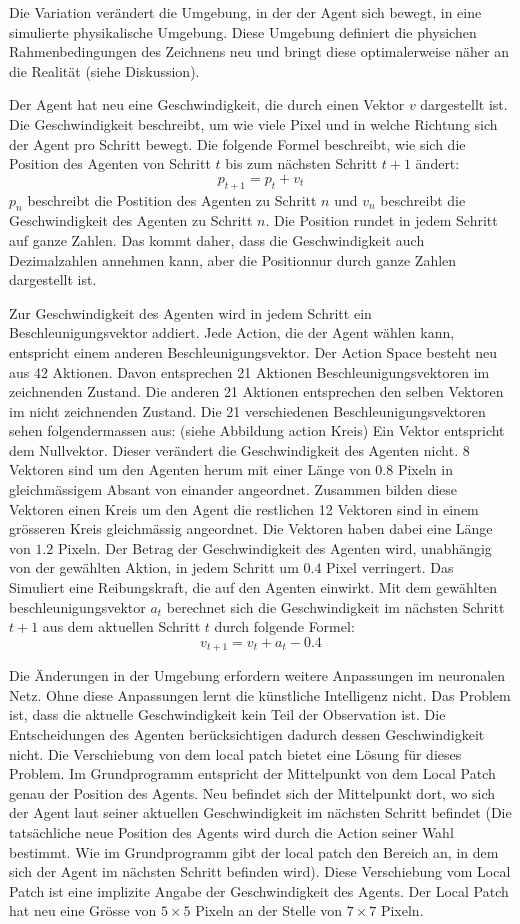 Die Variation verändert die Umgebung, in der der Agent sich bewegt, in eine
simulierte physikalische Umgebung. Diese Umgebung definiert die physichen
Rahmenbedingungen des Zeichnens neu und bringt diese optimalerweise näher an die
Realität (siehe Diskussion). 

Der Agent hat neu eine Geschwindigkeit, die durch einen Vektor $v$ dargestellt
ist. Die Geschwindigkeit beschreibt, um wie viele Pixel und in welche Richtung
sich der Agent pro Schritt bewegt.
Die folgende Formel beschreibt, wie sich die Position des Agenten von Schritt
$t$ bis zum nächsten Schritt $t+1$ ändert:
$$p_{t+1} = p_t + v_t$$
$p_n$ beschreibt die Postition des Agenten zu Schritt $n$ und $v_n$ beschreibt
die Geschwindigkeit des Agenten zu Schritt $n$. Die Position rundet in jedem
Schritt auf ganze Zahlen. Das kommt daher, dass die Geschwindigkeit auch
Dezimalzahlen annehmen kann, aber die Positionnur durch ganze Zahlen dargestellt
ist.

Zur Geschwindigkeit des Agenten wird in jedem Schritt ein Beschleunigungsvektor
addiert. Jede Action, die der Agent wählen kann, entspricht einem anderen
Beschleunigungsvektor. Der Action Space besteht neu aus 42 Aktionen. Davon
entsprechen 21 Aktionen Beschleunigungsvektoren im zeichnenden Zustand. Die
anderen 21 Aktionen entsprechen den selben Vektoren im nicht zeichnenden
Zustand. Die 21 verschiedenen Beschleunigungsvektoren sehen folgendermassen aus:
(siehe Abbildung action Kreis) Ein Vektor entspricht dem Nullvektor. Dieser
verändert die Geschwindigkeit des Agenten nicht. $8$ Vektoren sind um den
Agenten herum mit einer Länge von $0.8$ Pixeln in gleichmässigem Absant von
einander angeordnet. Zusammen bilden diese Vektoren einen Kreis um den Agent die
restlichen 12 Vektoren sind in einem grösseren Kreis gleichmässig angeordnet.
Die Vektoren haben dabei eine Länge von $1.2$ Pixeln. Der Betrag der
Geschwindigkeit des Agenten wird, unabhängig von der gewählten Aktion, in jedem
Schritt um $0.4$ Pixel verringert. Das Simuliert eine Reibungskraft, die auf den
Agenten einwirkt.
Mit dem gewählten beschleunigungsvektor $a_t$ berechnet sich die Geschwindigkeit
im nächsten Schritt $t+1$ aus dem aktuellen Schritt $t$ durch folgende Formel:
$$v_{t+1} = v_t + a_t - 0.4$$

Die Änderungen in der Umgebung erfordern weitere Anpassungen im neuronalen Netz.
Ohne diese Anpassungen lernt die künstliche Intelligenz nicht. Das Problem ist,
dass die aktuelle Geschwindigkeit kein Teil der Observation ist. Die
Entscheidungen des Agenten berücksichtigen dadurch dessen Geschwindigkeit nicht.
Die Verschiebung von dem local patch bietet eine Lösung für dieses Problem. Im
Grundprogramm entspricht der Mittelpunkt von dem Local Patch genau der Position
des Agents. Neu befindet sich der Mittelpunkt dort, wo sich der Agent laut
seiner aktuellen Geschwindigkeit im nächsten Schritt befindet (Die tatsächliche
neue Position des Agents wird durch die Action seiner Wahl bestimmt. Wie im
Grundprogramm gibt der local patch den Bereich an, in dem sich der Agent im
nächsten Schritt befinden wird). Diese Verschiebung vom Local Patch ist eine
implizite Angabe der Geschwindigkeit des Agents. Der Local Patch hat neu eine
Grösse von $5\times5$ Pixeln an der Stelle von $7\times7$ Pixeln.

